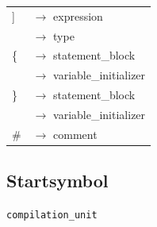 \documentclass[10pt,a4paper,titlepage]{article}
\begin{document}
\begin{ttfamily}
\begin{tabular}{| l  l |}
\hspace*{1cm}] & $\to$ expression \\
 & $\to$ type \\\hline
\hspace*{1cm}\{ & $\to$ statement\_block \\
 & $\to$ variable\_initializer\\\hline
\hspace*{1cm}\} & $\to$ statement\_block \\
 & $\to$ variable\_initializer\\\hline
\hspace*{1cm}\# & $\to$ comment\\\hline
\end{tabular}
\end{ttfamily}

\subsection{Startsymbol}
\texttt{compilation\_unit}
\end{document}
